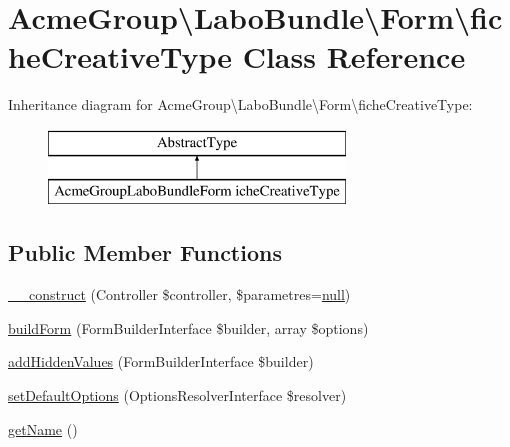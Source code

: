 \hypertarget{class_acme_group_1_1_labo_bundle_1_1_form_1_1fiche_creative_type}{\section{Acme\+Group\textbackslash{}Labo\+Bundle\textbackslash{}Form\textbackslash{}fiche\+Creative\+Type Class Reference}
\label{class_acme_group_1_1_labo_bundle_1_1_form_1_1fiche_creative_type}
}
Inheritance diagram for Acme\+Group\textbackslash{}Labo\+Bundle\textbackslash{}Form\textbackslash{}fiche\+Creative\+Type\+:\begin{figure}[H]
\begin{center}
\leavevmode
\includegraphics[height=2.000000cm]{class_acme_group_1_1_labo_bundle_1_1_form_1_1fiche_creative_type}
\end{center}
\end{figure}
\subsection*{Public Member Functions}
\begin{DoxyCompactItemize}
\item 
\hyperlink{class_acme_group_1_1_labo_bundle_1_1_form_1_1fiche_creative_type_a151636106a0908dd0b2e5bc54cbf4def}{\+\_\+\+\_\+construct} (Controller \$controller, \$parametres=\hyperlink{validate_8js_afb8e110345c45e74478894341ab6b28e}{null})
\item 
\hyperlink{class_acme_group_1_1_labo_bundle_1_1_form_1_1fiche_creative_type_a3784b975cd28c1ed8ff5bae33d32b438}{build\+Form} (Form\+Builder\+Interface \$builder, array \$options)
\item 
\hyperlink{class_acme_group_1_1_labo_bundle_1_1_form_1_1fiche_creative_type_af97aa3df701fc88d0b95c18953923390}{add\+Hidden\+Values} (Form\+Builder\+Interface \$builder)
\item 
\hyperlink{class_acme_group_1_1_labo_bundle_1_1_form_1_1fiche_creative_type_a28509aee7e7de3b58c49efa7b3932b2e}{set\+Default\+Options} (Options\+Resolver\+Interface \$resolver)
\item 
\hyperlink{class_acme_group_1_1_labo_bundle_1_1_form_1_1fiche_creative_type_a288aa83f857c850a98af136bd0358c0a}{get\+Name} ()
\end{DoxyCompactItemize}


